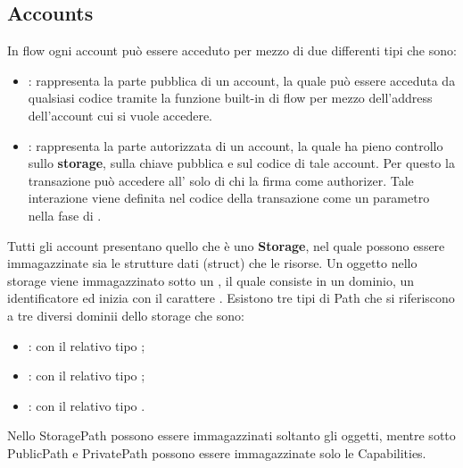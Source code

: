 \subsection{Accounts}
In flow ogni account può essere acceduto per mezzo di due differenti tipi che sono:
\begin{itemize}
    \item {}: rappresenta la parte pubblica di un account, la quale può essere acceduta da qualsiasi codice tramite la funzione built-in di flow  per mezzo dell'address dell'account cui si vuole accedere.
    \item {}: rappresenta la parte autorizzata di un account, la quale ha pieno controllo sullo \textbf{storage}, sulla chiave pubblica e sul codice di tale account. Per questo la transazione può accedere all' solo di chi la firma come authorizer. Tale interazione viene definita nel codice della transazione come un parametro nella fase di .
\end{itemize}
Tutti gli account presentano quello che è uno \textbf{Storage}, nel quale possono essere immagazzinate sia le strutture dati (struct) che le risorse. Un oggetto nello storage viene immagazzinato sotto un , il quale consiste in un dominio, un identificatore ed inizia con il carattere \codeinline{/}. Esistono tre tipi di Path che si riferiscono a tre diversi dominii dello storage che sono:
\begin{itemize}
    \item {}: con il relativo tipo ;
    \item {}: con il relativo tipo ;
    \item {}: con il relativo tipo .
\end{itemize}
Nello StoragePath possono essere immagazzinati soltanto gli oggetti, mentre sotto PublicPath e PrivatePath possono essere immagazzinate solo le Capabilities. 

